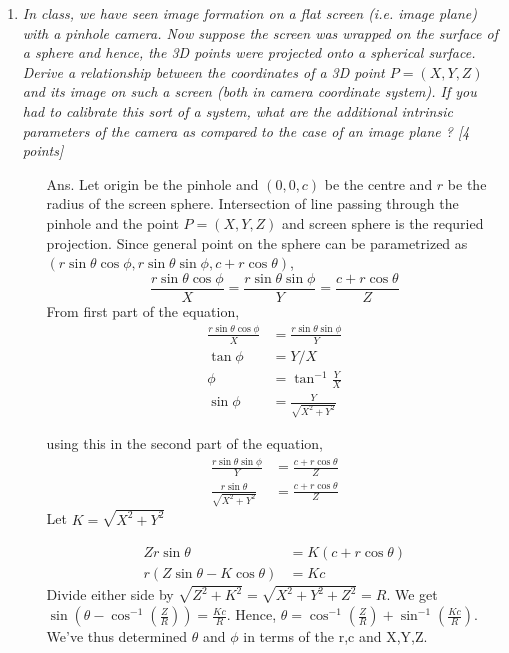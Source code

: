 \documentclass[11pt]{article}
\begin{document}
\maketitle

\begin{enumerate}
\item \textit{In class, we have seen image formation on a flat screen (i.e. image plane) with a pinhole camera. Now suppose the screen was wrapped on the surface of a sphere and hence, the 3D points were projected onto a spherical surface. Derive a relationship between the coordinates of a 3D point $P = (X,Y,Z)$ and its image on such a screen (both in camera coordinate system). If you had to calibrate this sort of a system, what are the additional intrinsic parameters of the camera as compared to the case of an image plane ? \textsf{[4 points]}}
\begin{itemize}
	\item[Ans.] Let origin be the pinhole and $(0,0,c)$ be the centre and $r$ be the radius of the screen sphere. Intersection of line passing through the pinhole and the point $P = (X,Y,Z)$ and screen sphere is the requried projection.
	Since general point on the sphere can be parametrized as $(r\sin{\theta}\cos{\phi}, r\sin{\theta}\sin{\phi}, c+r\cos{\theta})$,
	\[	\frac{r\sin{\theta}\cos{\phi}}{X} = \frac{r\sin{\theta}\sin{\phi}}{Y} = \frac{c+r\cos{\theta}}{Z}
	\]
	From first part of the equation,
	\begin{align}
		\frac{r\sin{\theta}\cos{\phi}}{X} &= \frac{r\sin{\theta}\sin{\phi}}{Y}\\
		\tan{\phi} &= Y/X  \\
		\phi &= \tan ^{-1}{\frac{Y}{X}} \\
		\sin{\phi} &= \frac{Y}{\sqrt{X^2+Y^2}}
	\end{align}

	using this in the second part of the equation,
	\begin{align}
		\frac{r\sin{\theta}\sin{\phi}}{Y} &= \frac{c+r\cos{\theta}}{Z}\\
		\frac{r\sin{\theta}}{\sqrt{X^2+Y^2}} &= \frac{c+r\cos{\theta}}{Z}		 
	\end{align}
	Let $K=\sqrt{X^2+Y^2}$

	\begin{align}
	 Zr\sin{\theta}&=K(c+r\cos{\theta})\\
	 r(Z\sin{\theta}-K\cos{\theta})&=Kc	  
	\end{align}
	Divide either side by $\sqrt{Z^2+K^2}=\sqrt{X^2+Y^2+Z^2}=R$.
	We get $\sin(\theta-\cos^{-1}(\frac{Z}{R}))=\frac{Kc}{R}$. Hence,
	$\theta=\cos^{-1}(\frac{Z}{R})+\sin^{-1}(\frac{Kc}{R})$.
We've thus determined $\theta$ and $\phi$ in terms of the r,c and X,Y,Z.


\end{itemize}
\end{enumerate}
\end{document}
